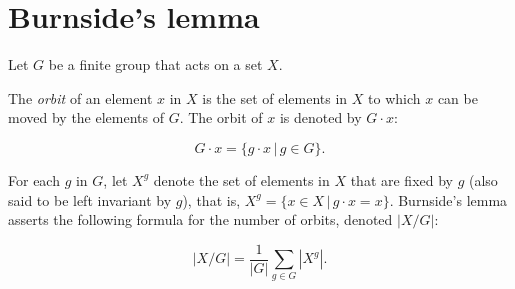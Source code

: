 \section{Burnside's lemma}

Let $G$ be a finite group that acts on a set $X$.

The \textit{orbit} of an element $x$ in $X$ is the set of elements
in $X$ to which $x$ can be moved by the elements of $G$.
The orbit of $x$ is denoted by $G \cdot x$:

 \[G \cdot x = \{g \cdot x\, |\, g \in G\}.\]

For each $g$ in $G$, let $X^g$ denote the set of elements
in $X$ that are fixed by $g$ (also said to be left invariant by $g$),
that is, $X^g = \{ x \in X\, |\, g \cdot x = x \}$.
Burnside's lemma asserts the following formula for the number of orbits,
denoted $|X/G|$:

\[|X/G| = \frac{1}{|G|} \sum_{g \in G} |X^g|.\]

